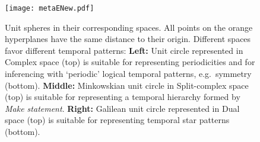 \documentclass[letterpaper]{article} %
\begin{document}
\begin{figure}[t]
    \centering
    \texttt{[image: metaENew.pdf]}
    \caption{
    Unit spheres in their corresponding spaces. All points on the orange hyperplanes have the same distance to their origin. Different spaces favor different temporal patterns:
    \textbf{Left:} Unit circle represented in Complex space (top) is suitable for representing periodicities and for inferencing with `periodic' logical temporal patterns, e.g.\ symmetry (bottom).
    \textbf{Middle:} Minkowskian unit circle  in Split-complex space (top) is suitable for representing a temporal hierarchy formed by \textit{Make statement}.
    \textbf{Right:} Galilean unit circle represented in Dual space (top) is suitable for representing temporal star patterns (bottom).
    }
    \label{fig:baseMotivExamp}
\end{figure}
\end{document}
